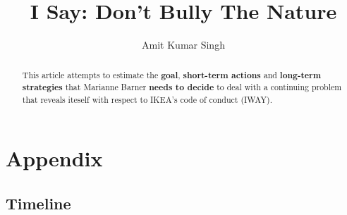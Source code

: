 \documentclass[11pt, a4paper, margin=1in]{IEEEtran}
\begin{document}
\title{I Say: Don't Bully The Nature}
\author{Amit Kumar Singh}
\maketitle

\renewcommand{\abstractname}{Executive Summary}
\begin{abstract}
This article attempts to estimate the \textbf{goal}, \textbf{short-term actions} and \textbf{long-term strategies} that Marianne Barner \textbf{needs to decide} to deal with a continuing problem that reveals iteself with respect to IKEA's code of conduct (IWAY).


\end{abstract}

\section{Appendix}
\subsection{Timeline}

\end{document}
